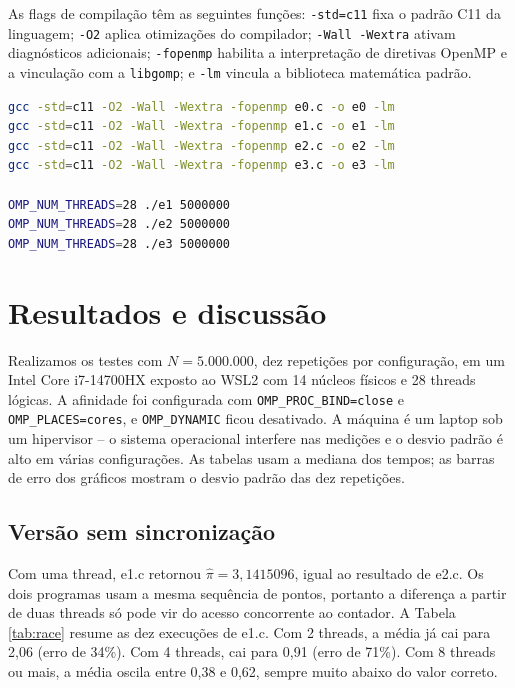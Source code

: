 \documentclass[11pt,letterpaper]{article}
\begin{document}
As flags de compilação têm as seguintes funções: \texttt{-std=c11} fixa o padrão C11 da linguagem; \texttt{-O2} aplica otimizações do compilador; \texttt{-Wall -Wextra} ativam diagnósticos adicionais; \texttt{-fopenmp} habilita a interpretação de diretivas OpenMP e a vinculação com a \texttt{libgomp}; e \texttt{-lm} vincula a biblioteca matemática padrão.

\begin{lstlisting}[language=bash, caption={Exemplo de compilação e execução}]
gcc -std=c11 -O2 -Wall -Wextra -fopenmp e0.c -o e0 -lm
gcc -std=c11 -O2 -Wall -Wextra -fopenmp e1.c -o e1 -lm
gcc -std=c11 -O2 -Wall -Wextra -fopenmp e2.c -o e2 -lm
gcc -std=c11 -O2 -Wall -Wextra -fopenmp e3.c -o e3 -lm

OMP_NUM_THREADS=28 ./e1 5000000
OMP_NUM_THREADS=28 ./e2 5000000
OMP_NUM_THREADS=28 ./e3 5000000
\end{lstlisting}

\newpage
\section{Resultados e discussão}

Realizamos os testes com $N=5.000.000$, dez repetições por configuração, em um Intel Core i7-14700HX exposto ao WSL2 com 14 núcleos físicos e 28 threads lógicas. A afinidade foi configurada com \texttt{OMP\_PROC\_BIND=close} e \texttt{OMP\_PLACES=cores}, e \texttt{OMP\_DYNAMIC} ficou desativado. A máquina é um laptop sob um hipervisor -- o sistema operacional interfere nas medições e o desvio padrão é alto em várias configurações. As tabelas usam a mediana dos tempos; as barras de erro dos gráficos mostram o desvio padrão das dez repetições.

\subsection{Versão sem sincronização}
Com uma thread, e1.c retornou $\hat{\pi}=3{,}1415096$, igual ao resultado de e2.c. Os dois programas usam a mesma sequência de pontos, portanto a diferença a partir de duas threads só pode vir do acesso concorrente ao contador. A Tabela \ref{tab:race} resume as dez execuções de e1.c. Com 2 threads, a média já cai para 2,06 (erro de 34\%). Com 4 threads, cai para 0,91 (erro de 71\%). Com 8 threads ou mais, a média oscila entre 0,38 e 0,62, sempre muito abaixo do valor correto.
\end{document}
